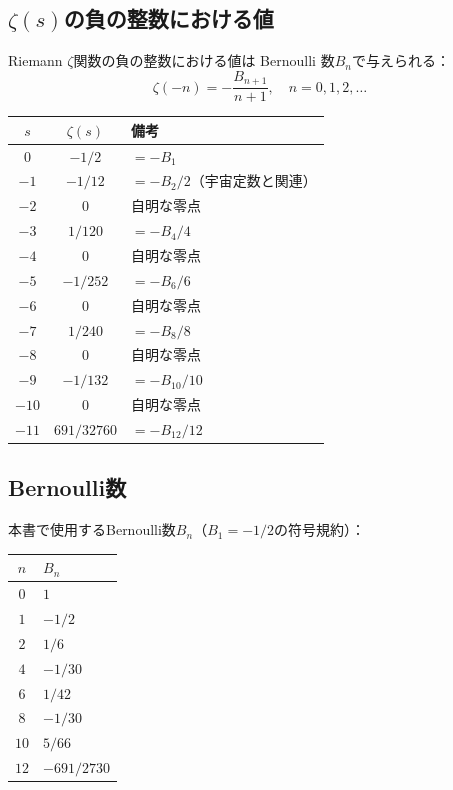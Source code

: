\subsection{$\zeta(s)$の負の整数における値}

Riemann $\zeta$関数の負の整数における値は Bernoulli 数$B_n$で与えられる：
\[
\zeta(-n) = -\frac{B_{n+1}}{n+1}, \quad n = 0, 1, 2, \ldots
\]

\begin{center}
\begin{tabular}{ccl}
\toprule
$s$ & $\zeta(s)$ & 備考 \\
\midrule
$0$ & $-1/2$ & $= -B_1$ \\
$-1$ & $-1/12$ & $= -B_2/2$（宇宙定数と関連） \\
$-2$ & $0$ & 自明な零点 \\
$-3$ & $1/120$ & $= -B_4/4$ \\
$-4$ & $0$ & 自明な零点 \\
$-5$ & $-1/252$ & $= -B_6/6$ \\
$-6$ & $0$ & 自明な零点 \\
$-7$ & $1/240$ & $= -B_8/8$ \\
$-8$ & $0$ & 自明な零点 \\
$-9$ & $-1/132$ & $= -B_{10}/10$ \\
$-10$ & $0$ & 自明な零点 \\
$-11$ & $691/32760$ & $= -B_{12}/12$ \\
\bottomrule
\end{tabular}
\end{center}


\subsection{Bernoulli数}

本書で使用するBernoulli数$B_n$（$B_1 = -1/2$の符号規約）：

\begin{center}
\begin{tabular}{cl}
\toprule
$n$ & $B_n$ \\
\midrule
$0$ & $1$ \\
$1$ & $-1/2$ \\
$2$ & $1/6$ \\
$4$ & $-1/30$ \\
$6$ & $1/42$ \\
$8$ & $-1/30$ \\
$10$ & $5/66$ \\
$12$ & $-691/2730$ \\
\bottomrule
\end{tabular}
\end{center}

